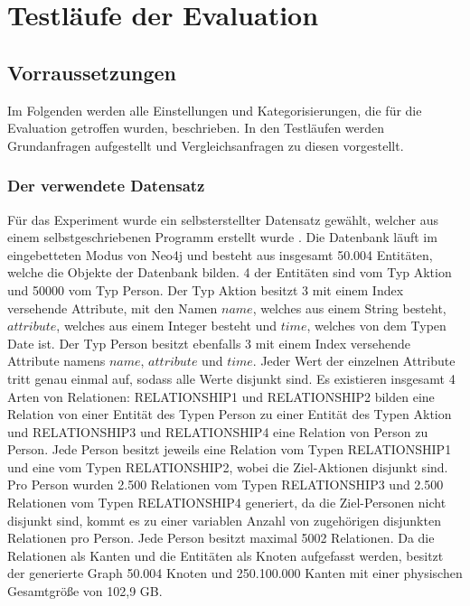 
\chapter{Testläufe der Evaluation} %

\label{Kapitel3} %

\section{Vorraussetzungen}
Im Folgenden werden alle Einstellungen und Kategorisierungen, die für die Evaluation getroffen wurden, beschrieben. In den Testläufen werden Grundanfragen aufgestellt und Vergleichsanfragen zu diesen vorgestellt.  
\subsection{Der verwendete Datensatz}
Für das Experiment wurde ein selbsterstellter Datensatz gewählt, welcher aus einem selbstgeschriebenen Programm erstellt wurde \parencite{Code}. Die Datenbank läuft im eingebetteten Modus von Neo4j und besteht aus insgesamt 50.004 Entitäten, welche die Objekte der Datenbank bilden. 4 der Entitäten sind  vom Typ Aktion und 50000 vom Typ Person. Der Typ Aktion besitzt 3 mit einem Index versehende Attribute, mit den Namen $name$, welches aus einem String besteht, $attribute$, welches aus einem Integer besteht und $time$, welches von dem Typen Date ist. Der Typ Person besitzt ebenfalls 3 mit einem Index versehende Attribute namens $name$, $attribute$ und $time$. Jeder Wert der einzelnen Attribute tritt genau einmal auf, sodass alle Werte disjunkt sind. \newline
Es existieren insgesamt 4 Arten von Relationen: RELATIONSHIP1 und RELATIONSHIP2 bilden eine Relation von einer Entität des Typen Person zu einer Entität des Typen Aktion  und  RELATIONSHIP3 und RELATIONSHIP4 eine Relation von Person zu Person. Jede Person besitzt jeweils eine Relation vom Typen RELATIONSHIP1 und eine vom Typen RELATIONSHIP2, wobei die Ziel-Aktionen disjunkt sind. Pro Person wurden 2.500 Relationen vom Typen RELATIONSHIP3 und 2.500 Relationen vom Typen RELATIONSHIP4 generiert, da die Ziel-Personen nicht disjunkt sind, kommt es zu einer variablen Anzahl von zugehörigen disjunkten Relationen pro Person. Jede Person besitzt maximal 5002 Relationen. Da die Relationen als Kanten und die Entitäten als Knoten aufgefasst werden, besitzt der generierte Graph 50.004 Knoten und 250.100.000 Kanten mit einer physischen Gesamtgröße von 102,9 GB. 
